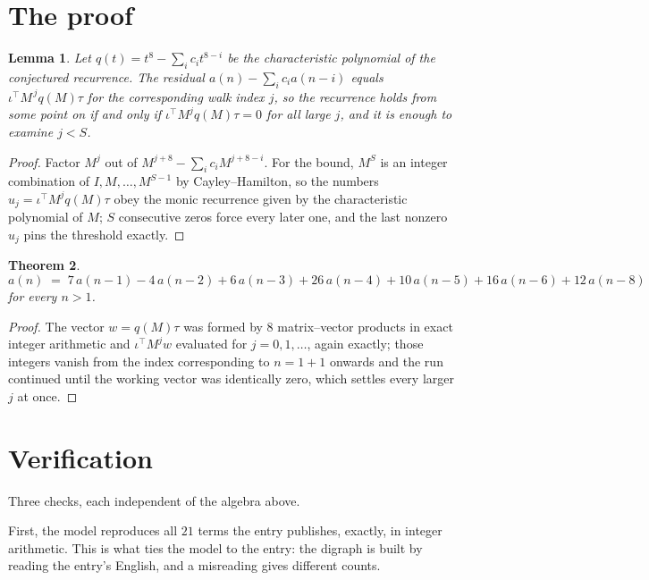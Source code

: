 \documentclass[11pt,a4paper]{article}
\theoremstyle{plain}
\newtheorem{theorem}{Theorem}
\newtheorem{lemma}[theorem]{Lemma}
\theoremstyle{definition}
\begin{document}
\section{The proof}

\begin{lemma}\label{lem:crit}
Let $q(t)=t^{8}-\sum_i c_it^{8-i}$ be the characteristic polynomial of the
conjectured recurrence. The residual $a(n)-\sum_ic_ia(n-i)$ equals
$\iota^{\!\top}M^{\,j}q(M)\tau$ for the corresponding walk index $j$, so the recurrence
holds from some point on if and only if $\iota^{\!\top}M^{j}q(M)\tau=0$ for all large $j$,
and it is enough to examine $j<S$.
\end{lemma}

\begin{proof}
Factor $M^{j}$ out of $M^{j+8}-\sum_ic_iM^{j+8-i}$. For the bound, $M^{S}$
is an integer combination of $I,M,\dots,M^{S-1}$ by Cayley--Hamilton, so the numbers
$u_j=\iota^{\!\top}M^{j}q(M)\tau$ obey the monic recurrence given by the characteristic
polynomial of $M$; $S$ consecutive zeros force every later one, and the last nonzero $u_j$
pins the threshold exactly.
\end{proof}

\begin{theorem}
\[
a(n)\;=\;7\,a(n-1) - 4\,a(n-2) + 6\,a(n-3) + 26\,a(n-4) + 10\,a(n-5) + 16\,a(n-6) + 12\,a(n-8)
\]
for every $n>1$.
\end{theorem}

\begin{proof}
The vector $w=q(M)\tau$ was formed by $8$ matrix--vector products in exact integer
arithmetic and $\iota^{\!\top}M^{j}w$ evaluated for $j=0,1,\dots$, again exactly; those
integers vanish from the index corresponding to $n=1+1$ onwards and the run continued
until the working vector was identically zero, which settles every larger $j$ at once.
\end{proof}

\section{Verification}

Three checks, each independent of the algebra above.

First, the model reproduces all $21$ terms the entry publishes, exactly, in integer
arithmetic. This is what ties the model to the entry: the digraph is built by reading the
entry's English, and a misreading gives different counts.
\end{document}
